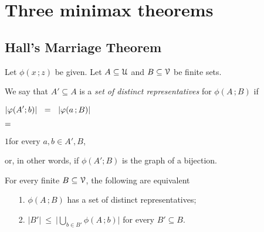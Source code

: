 \documentclass[scombinatorics.tex]{subfiles}
\begin{document}
\chapter{Three minimax theorems}
\label{minimax}


\def\medrel#1{\parbox[t]{6ex}{$\displaystyle\hfil #1$}}
\def\ceq#1#2#3{\parbox[t]{30ex}{$\displaystyle #1$}\medrel{#2}{$\displaystyle #3$}}

\def\separatore{\hfil o \rule[0.5ex]{4ex}{0.1ex} o \rule[0.5ex]{4ex}{0.1ex} o}





\section{Hall's Marriage Theorem}\label{marriage}

\def\ceq#1#2#3{\parbox[t]{30ex}{$\displaystyle #1$}\medrel{#2}{$\displaystyle #3$}}

Let $\phi(x\,;z)$ be given. 
Let $A\subseteq\EuScript U$ and $B\subseteq\EuScript V$ be finite sets. 

We say that $A'\subseteq A$ is a \emph{set of distinct representatives\/} for $\phi(A\,;B)$ if

\ceq{\hfill|\phi(A';b)|\medrel{=}|\phi(a\,;B)|}{=}{1}\quad for every $a,b\in A',B$,

or, in other words, if $\phi(A';B)$ is the graph of a bijection.

\begin{void_thm}\label{thm_marriage}
   For every finite $B\subseteq\EuScript V$, the following are equivalent
   \begin{itemize}
   \item[1.] $\phi(A\,;B)$ has a set of distinct representatives;

   \item[2.] $\displaystyle|B'|\ \le\ \bigg|\bigcup_{b\in B'}\phi(A\,;b)\bigg|$ for every $B'\subseteq B$.
   \end{itemize}
\end{void_thm}
\end{document}
